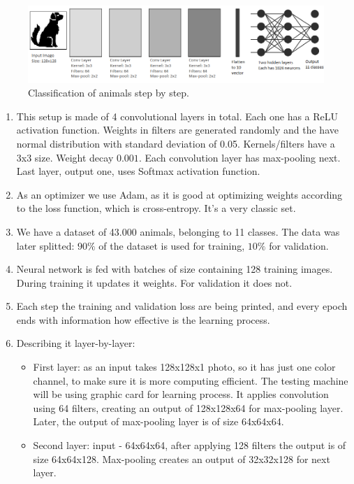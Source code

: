 \documentclass[conference]{IEEEtran}
\begin{document}
\begin{figure}[hbt!]
 \centering
    \includegraphics[scale=0.34]{convnet.png}
        \caption{Classification of animals step by step.}
	    \label{fig:my_label}
\end{figure}

\begin{enumerate}
    \item This setup is made of 4 convolutional layers in total. Each one has a ReLU activation function. Weights in filters are generated randomly and the have normal distribution with standard deviation of 0.05. Kernels/filters have a 3x3 size. Weight decay $0.001$. Each convolution layer has max-pooling next. Last layer, output one, uses Softmax activation function.
    \item As an optimizer we use Adam, as it is good at optimizing weights according to the loss
    function, which is cross-entropy. It's a very classic set.
    \item We have a dataset of 43.000 animals, belonging to 11 classes. The data was later splitted: $90\%$ of the dataset is used for training, $10\%$ for validation.
    \item Neural network is fed with batches of size containing 128 training images. During training it updates it weights. For validation it does not.
    \item Each step the training and validation loss are being printed, and every epoch ends with information how effective is the learning process.
    \item Describing it layer-by-layer:
    \begin{itemize}
        \item First layer: as an input takes 128x128x1 photo, so it has just one color channel, to make sure it is more computing efficient. The testing machine will be using graphic card for learning process.
        It applies convolution using 64 filters, creating an output of 128x128x64 for max-pooling layer. Later, the output of max-pooling layer is of size 64x64x64.
        \item Second layer: input - 64x64x64, after applying 128 filters the output is of size 64x64x128. Max-pooling creates an output of 32x32x128 for next layer.

\end{itemize}
\end{enumerate}
\end{document}
